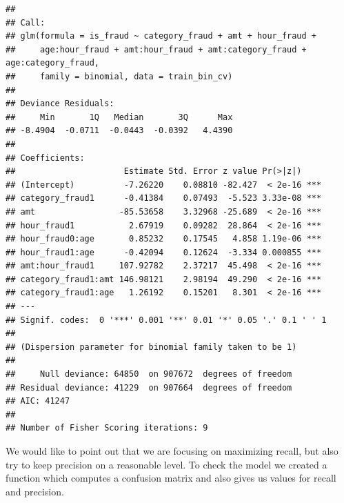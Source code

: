 \documentclass[
]{report}
\begin{document}
\begin{verbatim}
## 
## Call:
## glm(formula = is_fraud ~ category_fraud + amt + hour_fraud + 
##     age:hour_fraud + amt:hour_fraud + amt:category_fraud + age:category_fraud, 
##     family = binomial, data = train_bin_cv)
## 
## Deviance Residuals: 
##     Min       1Q   Median       3Q      Max  
## -8.4904  -0.0711  -0.0443  -0.0392   4.4390  
## 
## Coefficients:
##                      Estimate Std. Error z value Pr(>|z|)    
## (Intercept)          -7.26220    0.08810 -82.427  < 2e-16 ***
## category_fraud1      -0.41384    0.07493  -5.523 3.33e-08 ***
## amt                 -85.53658    3.32968 -25.689  < 2e-16 ***
## hour_fraud1           2.67919    0.09282  28.864  < 2e-16 ***
## hour_fraud0:age       0.85232    0.17545   4.858 1.19e-06 ***
## hour_fraud1:age      -0.42094    0.12624  -3.334 0.000855 ***
## amt:hour_fraud1     107.92782    2.37217  45.498  < 2e-16 ***
## category_fraud1:amt 146.98121    2.98194  49.290  < 2e-16 ***
## category_fraud1:age   1.26192    0.15201   8.301  < 2e-16 ***
## ---
## Signif. codes:  0 '***' 0.001 '**' 0.01 '*' 0.05 '.' 0.1 ' ' 1
## 
## (Dispersion parameter for binomial family taken to be 1)
## 
##     Null deviance: 64850  on 907672  degrees of freedom
## Residual deviance: 41229  on 907664  degrees of freedom
## AIC: 41247
## 
## Number of Fisher Scoring iterations: 9
\end{verbatim}

We would like to point out that we are focusing on maximizing recall,
but also try to keep precision on a reasonable level. To check the model
we created a function which computes a confusion matrix and also gives
us values for recall and precision.
\end{document}
